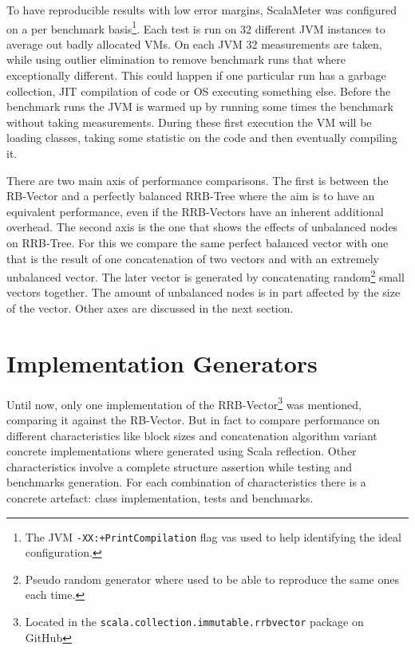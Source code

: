 To have reproducible results with low error margins, ScalaMeter was configured on a per benchmark basis\footnote{The JVM \texttt{-XX:+PrintCompilation} flag vas used to help identifying the ideal configuration.}. Each test is run on 32 different JVM instances to average out badly allocated VMs. On each JVM 32 measurements are taken, while using outlier elimination to remove benchmark runs that where exceptionally different. This could happen if one particular run has a garbage collection, JIT compilation of code or OS executing something else. Before the benchmark runs the JVM is warmed up by running some times the benchmark without taking measurements. During these first execution the VM will be loading classes, taking some statistic on the code and then eventually compiling it.

There are two main axis of performance comparisons. The first is between the RB-Vector and a perfectly balanced RRB-Tree where the aim is to have an equivalent performance, even if the RRB-Vectors have an inherent additional overhead. The second axis is the one that shows the effects of unbalanced nodes on RRB-Tree. For this we compare the same perfect balanced vector with one that is the result of one concatenation of two vectors and with an extremely unbalanced vector. The later vector is generated by concatenating random\footnote{Pseudo random generator where used to be able to reproduce the same ones each time.} small vectors together. The amount of unbalanced nodes is in part affected by the size of the vector. Other axes are discussed in the next section.

\clearpage
\section{Implementation Generators}
\label{ImplementationGenerators}
Until now, only one implementation of the RRB-Vector\footnote{Located in the \texttt{scala.collection.immutable.rrbvector} package on GitHub} was mentioned, comparing it against the RB-Vector. But in fact to compare performance on different characteristics like block sizes and concatenation algorithm variant concrete implementations where generated using Scala reflection. Other characteristics involve a complete structure assertion while testing and benchmarks generation. For each combination of characteristics there is a concrete artefact: class implementation, tests and benchmarks.

